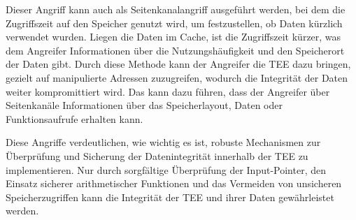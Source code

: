 Dieser Angriff kann auch als Seitenkanalangriff ausgeführt werden, bei dem die Zugriffszeit auf den Speicher genutzt wird, um festzustellen, ob Daten kürzlich verwendet wurden. Liegen die Daten im Cache, ist die Zugriffszeit kürzer, was dem Angreifer Informationen über die Nutzungshäufigkeit und den Speicherort der Daten gibt. Durch diese Methode kann der Angreifer die TEE dazu bringen, gezielt auf manipulierte Adressen zuzugreifen, wodurch die Integrität der Daten weiter kompromittiert wird. Das kann dazu führen, dass der Angreifer über Seitenkanäle Informationen über das Speicherlayout, Daten oder Funktionsaufrufe erhalten kann.


Diese Angriffe verdeutlichen, wie wichtig es ist, robuste Mechanismen zur Überprüfung und Sicherung der Datenintegrität innerhalb der TEE zu implementieren. Nur durch sorgfältige Überprüfung der Input-Pointer, den Einsatz sicherer arithmetischer Funktionen und das Vermeiden von unsicheren Speicherzugriffen kann die Integrität der TEE und ihrer Daten gewährleistet werden.
